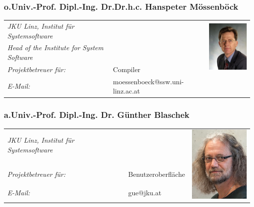 \subsubsection*{o.Univ.-Prof. Dipl.-Ing. Dr.Dr.h.c. Hanspeter Mössenböck}
\renewcommand{\arraystretch}{1.2}
\begin{tabularx}{1\textwidth}{@{} p{7cm} X l @{}}

\emph{JKU Linz, Institut für Systemsoftware}&&
\multirow{3}{2.5cm}{\includegraphics[width=3cm]{./media/images/project_team/Moessenboeck.png}
} 
\\
\emph{Head of the Institute for System Software} && \\
\emph{Projektbetreuer für:} & Compiler & \\
\emph{E-Mail:} & moessenboeck@ssw.uni-linz.ac.at & \\
\end{tabularx}

\subsubsection*{a.Univ.-Prof. Dipl.-Ing. Dr. Günther Blaschek}
\renewcommand{\arraystretch}{1.2}
\begin{tabularx}{1\textwidth}{@{} p{7cm} X l @{}}

\emph{JKU Linz, Institut für Systemsoftware}&&
\multirow{5}{2.5cm}{\includegraphics[width=3cm]{./media/images/project_team/Blaschek.png}
} 
\\
&& \\
\emph{Projektbetreuer für:} & Benutzeroberfläche & \\
\emph{E-Mail:} & gue@jku.at & \\
\end{tabularx}

